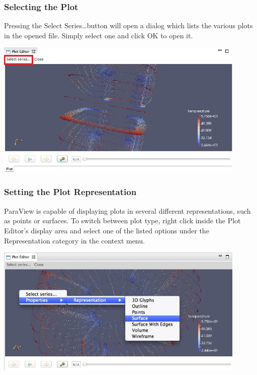 \documentclass{article}
\begin{document}
\subsubsection{Selecting the Plot}

Pressing the Select Series\ldots button will open a dialog which lists the
various plots in the opened file. Simply select one and click OK to open it. 

\begin{center}
\includegraphics[width=12cm]{images/ParaViewPlotEditorSelectSeriesButton}
\end{center}

\subsubsection{Setting the Plot Representation} 

ParaView is capable of displaying plots in several different representations,
such as points or surfaces. To switch between plot type, right click inside the Plot
Editor's display area and select one of the listed options under the
Representation category in the context menu.

\begin{center}
\includegraphics[width=12cm]{images/ParaViewRepresentationDropDown}
\end{center}
\end{document}
